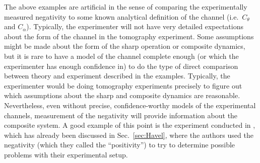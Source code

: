 The above examples are artificial in the sense of comparing the experimentally measured negativity to some known analytical definition of the channel (i.e.\ $C_\theta$ and $C_\alpha$).  Typically, the experimenter will not have very detailed expectations about the form of the channel in the tomography experiment.  Some assumptions might be made about the form of the sharp operation or composite dynamics, but it is rare to have a model of the channel complete enough (or which the experimenter has enough confidence in) to do the type of direct comparison between theory and experiment described in the examples.  Typically, the experimenter would be doing tomography experiments precisely to figure out which assumptions about the sharp and composite dynamics are reasonable.  Nevertheless, even without precise, confidence-worthy models of the experimental channels, measurement of the negativity will provide information about the composite system.  A good example of this point is the experiment conducted in \cite{Cory2004}, which has already been discussed in Sec.\ \ref{sec:Havel}, where the authors used the negativity (which they called the ``positivity'') to try to determine possible problems with their experimental setup. 

